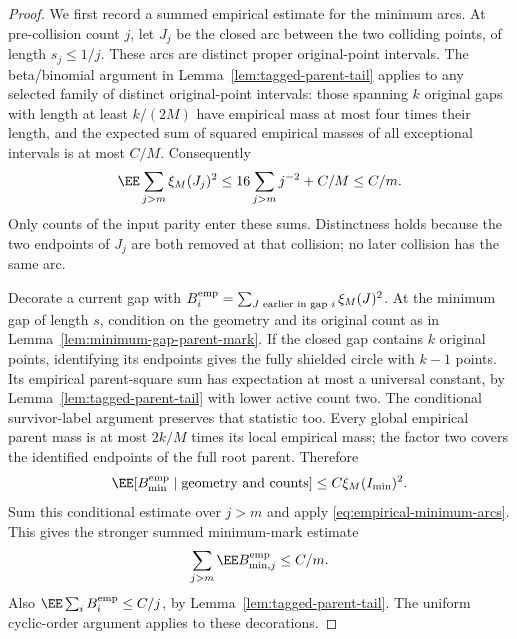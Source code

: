 \documentclass[11pt,letterpaper]{article}
\begin{document}
\begin{proof}
We first record a summed empirical estimate for the minimum
arcs. At pre-collision count $j$, let $J_j$ be the closed arc
between the two colliding points, of length $s_j\le1/j$.
These arcs are distinct proper original-point intervals.
The beta/binomial argument in Lemma~\ref{lem:tagged-parent-tail}
applies to any selected family of distinct original-point intervals:
those spanning $k$ original gaps with length at least $k/(2M)$
have empirical mass at most four times their length, and the
expected sum of squared empirical masses of all exceptional
intervals is at most $C/M$. Consequently
\begin{equation}\label{eq:empirical-minimum-arcs}
 \EE\sum_{j>m}\xi_M(J_j)^2
       \le16\sum_{j>m}j^{-2}+C/M\le C/m.
\end{equation}
Only counts of the input parity enter these sums. Distinctness
holds because the two endpoints of $J_j$ are both removed at
that collision; no later collision has the same arc.

Decorate a current gap with
$B_i^{\rm emp}=\sum_{J\text{ earlier in gap }i}\xi_M(J)^2$.
At the minimum gap of length $s$, condition on the geometry
and its original count as in
Lemma~\ref{lem:minimum-gap-parent-mark}.
If the closed gap contains $k$ original points, identifying
its endpoints gives the fully shielded circle with $k-1$
points. Its empirical parent-square sum has expectation at
most a universal constant, by Lemma~\ref{lem:tagged-parent-tail}
with lower active count two. The conditional survivor-label
argument preserves that statistic too. Every global empirical
parent mass is at most $2k/M$ times its local empirical mass;
the factor two covers the identified endpoints of the full
root parent. Therefore
\[
 \EE[B_{\min}^{\rm emp}\mid\text{geometry and counts}]
                                      \le C\xi_M(I_{\min})^2.
\]
Sum this conditional estimate over $j>m$ and apply
\eqref{eq:empirical-minimum-arcs}. This gives the stronger
summed minimum-mark estimate
\begin{equation}\label{eq:empirical-minimum-mark}
 \sum_{j>m}\EE B_{\min,j}^{\rm emp}\le C/m.
\end{equation}
Also $\EE\sum_iB_i^{\rm emp}\le C/j$, by
Lemma~\ref{lem:tagged-parent-tail}.
The uniform cyclic-order argument applies to these decorations.


\end{proof}
\end{document}
